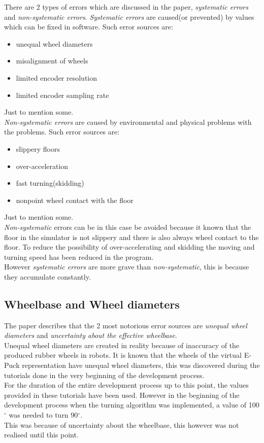 There are 2 types of errors which are discussed in the paper, \textit{systematic errors} and \textit{non-systematic errors}. \textit{Systematic errors} are caused(or prevented) by values which can be fixed in software. Such error sources are: \\
\begin{itemize}
\item unequal wheel diameters
\item misalignment of wheels
\item limited encoder resolution
\item limited encoder sampling rate
\end{itemize}
Just to mention some. \\
\textit{Non-systematic errors} are caused by environmental and physical problems with the problems.
Such error sources are:\\
\begin{itemize}
\item slippery floors
\item over-acceleration
\item fast turning(skidding)
\item nonpoint wheel contact with the floor
\end{itemize}
Just to mention some.\\
\textit{Non-systematic} errors can be in this case be avoided because it known that the floor in the simulator is not slippery and there is also always wheel contact to the floor. To reduce the possibility of over-accelerating and skidding the moving and turning speed has been reduced in the program.\\
However \textit{systematic errors} are more grave than \textit{non-systematic}, this is because they accumulate constantly.\\[3ex]

\subsection{Wheelbase and Wheel diameters}
The paper describes that the 2 most notorious  error sources are \textit{unequal wheel diameters} and \textit{uncertainty about the effective wheelbase}.\\
Unequal wheel diameters are created in reality because of inaccuracy of the produced rubber wheels in robots. It is known that the wheels of the virtual E-Puck representation have unequal wheel diameters, this was discovered during the tutorials done in the very beginning of the development process.\\
For the duration of the entire development process up to this point, the values provided in these tutorials have been used. However in the beginning of the development process when the turning algorithm was implemented, a value of 100$^{\circ}$ was needed to turn 90$^{\circ}$.\\
This was because of uncertainty about the wheelbase, this however was not realised until this point.\\[3ex]

